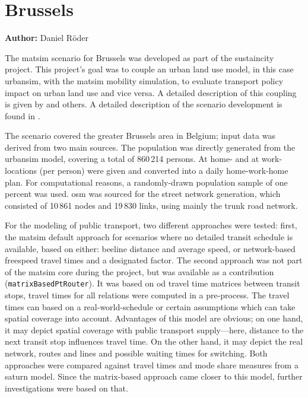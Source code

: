\section{Brussels}
\label{sec:brussels}
\hfill \textbf{Author:} Daniel Röder


The \gls{matsim} scenario for Brussels was developed as part of the \gls{sustaincity} project. This project's goal was to couple an urban land use model, in this case \gls{urbansim}, with the \gls{matsim} mobility simulation, to evaluate transport policy impact on urban land use and vice versa. A detailed description of this coupling is given by \citet{Nicolai2013PhD} and others. A detailed description of the scenario development is found in \citet{RoederNagel2013SketchPlanningBrussels}.

The scenario covered the greater Brussels area in Belgium; input data was derived from two main sources. The population was directly generated from the \gls{urbansim} model, covering a total of 860\,214 persons. At home- and at work-locations (per person) were given and converted into a daily home-work-home plan. For computational reasons, a randomly-drawn population sample of one percent was used. \gls{osm} was sourced for the street network generation, which consisted of 10\,861 nodes and 19\,830 links, \ie using mainly the trunk road network.

For the modeling of public transport, two different approaches were tested:  first, the \gls{matsim} default approach for scenarios where no detailed transit schedule is available, based on either: beeline distance and average speed, or network-based freespeed travel times and a designated factor. The second approach was not part of the \gls{matsim} core during the project, but was available as a contribution (\lstinline|matrixBasedPtRouter|). It was based on \gls{od} travel time matrices between transit stops, \ie travel times for all relations were computed in a pre-process. The travel times can based on a real-world-schedule or certain assumptions which can take spatial coverage into account. Advantages of this model are obvious; on one hand, it may depict spatial coverage with public transport supply---here, distance to the next transit stop influences travel time. On the other hand, it may depict the real network, \ie routes and lines and possible waiting times for switching. Both approaches were compared against travel times and mode share measures from a \gls{saturn} model. Since the matrix-based approach came closer to this model, further investigations were based on that.

